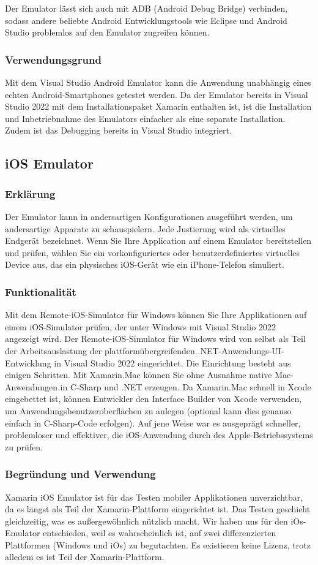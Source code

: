 Der Emulator lässt sich auch mit ADB (Android Debug Bridge) verbinden, 
sodass andere beliebte Android Entwicklungstools wie Eclipse und Android Studio problemlos auf den Emulator zugreifen können.

\subsubsection{Verwendungsgrund}
Mit dem Visual Studio Android Emulator kann die Anwendung unabhängig eines echten Android-Smartphones getestet werden. 
Da der Emulator bereits in Visual Studio 2022 mit dem Installationspaket Xamarin enthalten ist, ist die Installation und Inbetriebnahme des 
Emulators einfacher als eine separate Installation. Zudem ist das Debugging bereits in Visual Studio integriert.


\subsection{iOS Emulator}
\cite{IOsEmulatorOnMac}
\cite{IOsEmulatorOnWin}
\subsubsection*{Erklärung}
Der Emulator kann in andersartigen Konfigurationen 
ausgeführt werden, um andersartige Apparate zu schauspielern. 
Jede Justierung wird als virtuelles Endgerät bezeichnet. 
Wenn Sie Ihre Application auf einem Emulator bereitstellen 
und prüfen, wählen Sie ein vorkonfiguriertes oder 
benutzerdefiniertes virtuelles Device aus, das ein 
physisches iOS-Gerät wie ein iPhone-Telefon simuliert.
\subsubsection*{Funktionalität}
Mit dem Remote-iOS-Simulator für Windows können Sie Ihre 
Applikationen auf einem iOS-Simulator prüfen, der unter Windows mit 
Visual Studio 2022 angezeigt wird.
Der Remote-iOS-Simulator für Windows wird von selbst als Teil der 
Arbeitsauslastung der plattformübergreifenden .NET-Anwendungs-UI-Entwicklung 
in Visual Studio 2022 eingerichtet. Die Einrichtung besteht aus einigen Schritten.
Mit Xamarin.Mac können Sie ohne Ausnahme native Mac-Anwendungen in C-Sharp und .NET 
erzeugen. Da Xamarin.Mac schnell in Xcode eingebettet ist, können 
Entwickler den Interface Builder von Xcode verwenden, um Anwendungsbenutzeroberflächen 
zu anlegen (optional kann dies genauso einfach in C-Sharp-Code erfolgen). 
Auf jene Weise war es ausgeprägt schneller, problemloser und effektiver, 
die iOS-Anwendung durch des Apple-Betriebssystems zu prüfen.
\subsubsection*{Begründung und Verwendung}
Xamarin iOS Emulator ist für das Testen mobiler Applikationen unverzichtbar, 
da es längst als Teil der Xamarin-Plattform eingerichtet ist. Das Testen 
geschieht gleichzeitig, was es außergewöhnlich nützlich macht. 
Wir haben uns für den iOs-Emulator entschieden, weil es wahrscheinlich 
ist, auf zwei differenzierten Plattformen (Windows und iOs) zu 
begutachten. Es existieren keine Lizenz, trotz alledem es ist Teil der Xamarin-Plattform.
\newpage